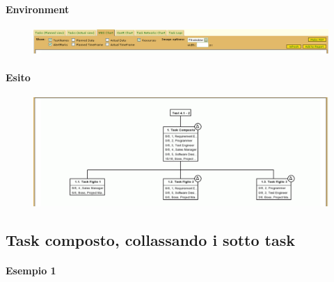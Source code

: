 \paragraph{Environment}
\begin{figure}[h!]
\centering
\includegraphics[width=\textwidth]{tests/TEST_WBS/4.1/4.1_2/Esempio_2/environment.png}
\end{figure}

\paragraph{Esito}
\begin{figure}[h!]
\centering
\includegraphics[width=\textwidth]{tests/TEST_WBS/4.1/4.1_2/Esempio_2/output.png}
\end{figure}
\newpage


\subsection{Task composto, collassando i sotto task}
\paragraph{Esempio 1}
